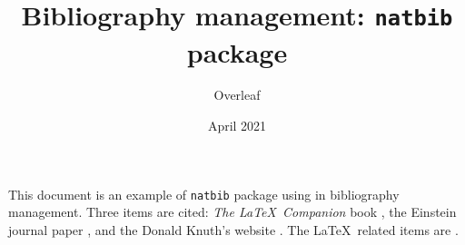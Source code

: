\documentclass{article}
\title{Bibliography management: \texttt{natbib} package}
\author{Overleaf}
\date {April 2021}
\begin{document}
	
	\maketitle
	
	This document is an example of \texttt{natbib} package using in bibliography
	management. Three items are cited: \textit{The \LaTeX\ Companion} book 
	\cite{latexcompanion}, the Einstein journal paper \cite{einstein}, and the 
	Donald Knuth's website \cite{knuthwebsite}. The \LaTeX\ related items are 
	\cite{latexcompanion,knuthwebsite}. 
	
	\medskip
	
	
	
\end{document}
